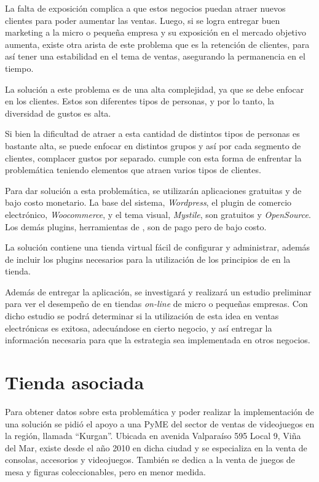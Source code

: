 La falta de exposición complica a que estos negocios puedan atraer nuevos clientes
para poder aumentar las ventas.
Luego, si se logra entregar buen marketing a la micro o pequeña empresa y su
exposición en el mercado objetivo aumenta, existe otra arista de este problema
que es la retención de clientes, para así tener una estabilidad en el tema
de ventas, asegurando la permanencia en el tiempo.

La solución a este problema es de una alta complejidad, ya que se debe enfocar en
los clientes.
Estos son diferentes tipos de personas, y por lo tanto, la diversidad de gustos es
alta.

Si bien la dificultad de atraer a esta cantidad de distintos tipos de personas
es bastante alta, se puede enfocar en distintos grupos y así por cada segmento
de clientes, complacer gustos por separado.
{\GAM} cumple con esta forma de enfrentar la problemática teniendo elementos que
atraen varios tipos de clientes.

Para dar solución a esta problemática, se utilizarán aplicaciones gratuitas y de
bajo costo monetario. La base del sistema, \emph{Wordpress}, el plugin de comercio
electrónico, \emph{Woocommerce}, y el tema visual, \emph{Mystile}, son gratuitos y \emph{OpenSource}.
Los demás plugins, herramientas de {\gam}, son de pago pero de bajo costo.

La solución contiene una tienda virtual fácil de configurar y administrar,
además de incluir los plugins necesarios para la utilización de los principios
de {\gam} en la tienda.

Además de entregar la aplicación, se investigará y realizará un estudio preliminar
para ver el desempeño de {\gam} en tiendas \emph{on-line} de micro o pequeñas empresas.
Con dicho estudio se podrá determinar si la utilización de esta idea en ventas
electrónicas es exitosa, adecuándose en cierto negocio,
y así entregar la información necesaria para que la estrategia sea implementada
en otros negocios.

\section{Tienda asociada}

Para obtener datos sobre esta problemática y poder realizar la implementación de una
solución se pidió el apoyo a una PyME del sector de ventas de videojuegos en la región,
llamada ``Kurgan''. Ubicada en avenida Valparaíso 595 Local 9, Viña del Mar, existe desde
el año 2010 en dicha ciudad y se especializa en la venta de consolas, accesorios y videojuegos.
También se dedica a la venta de juegos de mesa y figuras coleccionables, pero en menor medida.

